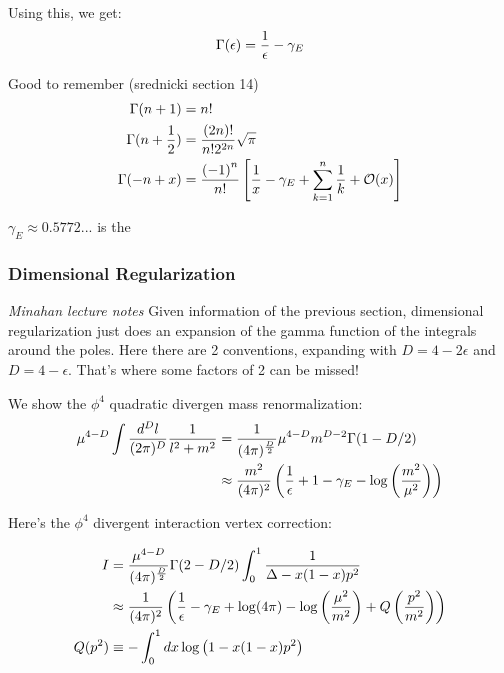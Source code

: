 \documentclass[11pt]{scrartcl}
\begin{document}
Using this, we get:
\begin{align}
	\Gamma(\epsilon) = {1 \over \epsilon} - \gamma_E
\end{align}


Good to remember (srednicki section 14)
\begin{align}
	\Gamma(n+1) &= n! \\
	\Gamma(n+\frac12) &= {(2n)! \over n! 2^{2n}} \sqrt{\pi} \\
	\Gamma(-n + x) & = {\left( -1 \right)^n \over n!}  \left[ {1 \over x} - \gamma_E + \sum_{k=1}^n {1 \over k} + \mathcal{O}(x) \right]
\end{align}

$\gamma_E \approx 0.5772...$ is the 

\subsubsection{Dimensional Regularization}
\emph{Minahan lecture notes }
Given information of the previous section, dimensional regularization just does an expansion of the gamma function of the integrals around the poles.
Here there are 2 conventions, expanding with $D = 4 - 2 \epsilon$ and 
$D = 4 - \epsilon$.  That's where some factors of 2 can be missed!

We show the $\phi^4$ quadratic divergen mass renormalization:
\begin{align}
	\mu^{4 - D}\int {d^D l \over (2 \pi)^D} {1 \over l^2 + m^2} & = {1 \over (4 \pi)^{D \over 2}} \mu^{4-D} m^{D-2}  \Gamma(1 - D/2) \\
	& \approx {m^2 \over (4 \pi)^2} \left({1 \over \epsilon} + 1 - \gamma_E - \log \left({m^2 \over \mu^2} \right)  \right)
\end{align}

Here's the $\phi^4$ divergent interaction vertex correction:

\begin{align}
	I & = {\mu^{4 -D} \over (4 \pi)^{D \over 2}} \Gamma(2 - D/2) \int_0^1 {1 \over \Delta - x(1 -x) p^2} \\
	& \approx {1 \over (4 \pi)^2} \left({1 \over \epsilon} - \gamma_E + \log(4 \pi) - \log \left({\mu^2 \over m^2} \right) + Q\left({p^2 \over m^2}\right)  \right) \\
	Q(p^2) & \equiv - \int_0^1 dx \log \left(1 - x(1-x) p^2 \right) \\
\end{align}
\end{document}
